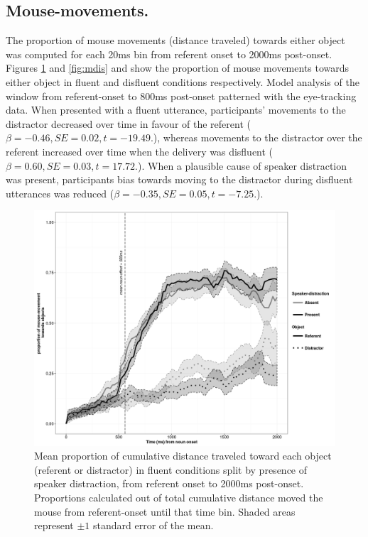 \documentclass[a4paper,man,natbib]{apa6}
\begin{document}
\subsection{Mouse-movements.}
The proportion of mouse movements (distance traveled) towards either object was computed for each 20ms bin from referent onset to 2000ms post-onset. 
Figures \ref{fig:mflu} and \ref{fig:mdis} and show the proportion of mouse movements towards either object in fluent and disfluent conditions respectively. 
Model analysis of the window from referent-onset to 800ms post-onset patterned with the eye-tracking data. 
When presented with a fluent utterance, participants' movements to the distractor decreased over time in favour of the referent ($\beta = -0.46, SE = 0.02, t=-19.49.$), whereas movements to the distractor over the referent increased over time when the delivery was disfluent ($\beta = 0.60, SE = 0.03, t=17.72.$). 
When a plausible cause of speaker distraction was present, participants bias towards moving to the distractor during disfluent utterances was reduced ($\beta = -0.35, SE = 0.05, t=-7.25.$).\\



\begin{figure}[Ht]
  \centering
	\includegraphics[scale=.5]{mflu.png}
  \caption{Mean proportion of cumulative distance traveled toward each object (referent or distractor) in fluent conditions split by presence of speaker distraction, from referent onset to 2000ms post-onset. Proportions calculated out of total cumulative distance moved the mouse from referent-onset until that time bin. Shaded areas represent $\pm 1$ standard error of the mean.}
  \label{fig:mflu}
\end{figure}
\end{document}
